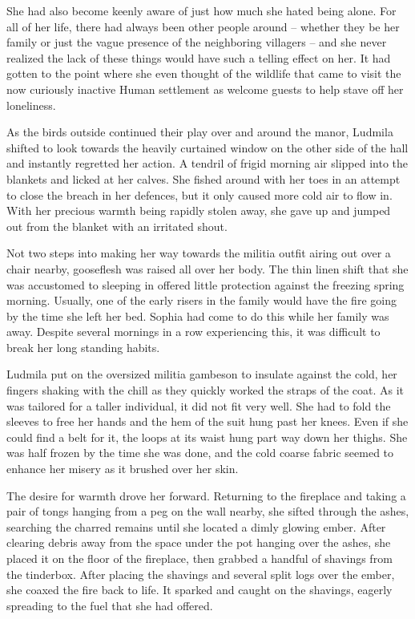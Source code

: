  

She had also become keenly aware of just how much she hated being alone. For all of her life, there had always been other people around – whether they be her family or just the vague presence of the neighboring villagers – and she never realized the lack of these things would have such a telling effect on her. It had gotten to the point where she even thought of the wildlife that came to visit the now curiously inactive Human settlement as welcome guests to help stave off her loneliness.

 

As the birds outside continued their play over and around the manor, Ludmila shifted to look towards the heavily curtained window on the other side of the hall and instantly regretted her action. A tendril of frigid morning air slipped into the blankets and licked at her calves. She fished around with her toes in an attempt to close the breach in her defences, but it only caused more cold air to flow in. With her precious warmth being rapidly stolen away, she gave up and jumped out from the blanket with an irritated shout.

 

Not two steps into making her way towards the militia outfit airing out over a chair nearby, gooseflesh was raised all over her body. The thin linen shift that she was accustomed to sleeping in offered little protection against the freezing spring morning. Usually, one of the early risers in the family would have the fire going by the time she left her bed. Sophia had come to do this while her family was away. Despite several mornings in a row experiencing this, it was difficult to break her long standing habits.

 

Ludmila put on the oversized militia gambeson to insulate against the cold, her fingers shaking with the chill as they quickly worked the straps of the coat. As it was tailored for a taller individual, it did not fit very well. She had to fold the sleeves to free her hands and the hem of the suit hung past her knees. Even if she could find a belt for it, the loops at its waist hung part way down her thighs. She was half frozen by the time she was done, and the cold coarse fabric seemed to enhance her misery as it brushed over her skin.

 

The desire for warmth drove her forward. Returning to the fireplace and taking a pair of tongs hanging from a peg on the wall nearby, she sifted through the ashes, searching the charred remains until she located a dimly glowing ember. After clearing debris away from the space under the pot hanging over the ashes, she placed it on the floor of the fireplace, then grabbed a handful of shavings from the tinderbox. After placing the shavings and several split logs over the ember, she coaxed the fire back to life. It sparked and caught on the shavings, eagerly spreading to the fuel that she had offered.

